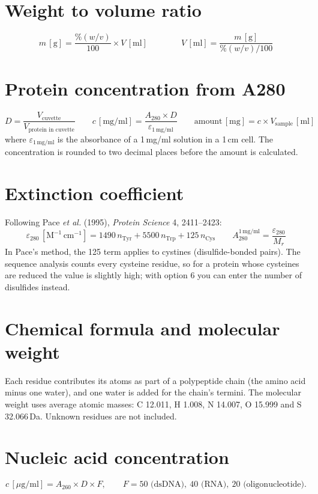 \documentclass[11pt,a4paper,oneside]{report}
\begin{document}
\section{Weight to volume ratio}
\[
  m\,[\text{g}] = \frac{\%(w/v)}{100}\times V\,[\text{ml}]
  \qquad\qquad
  V\,[\text{ml}] = \frac{m\,[\text{g}]}{\%(w/v)/100}
\]

\section{Protein concentration from A280}
\[
  D = \frac{V_\text{cuvette}}{V_\text{protein in cuvette}}
  \qquad
  c\,[\text{mg/ml}] = \frac{A_{280}\times D}{\varepsilon_{1\,\text{mg/ml}}}
  \qquad
  \text{amount}\,[\text{mg}] = c\times V_\text{sample}\,[\text{ml}]
\]
where $\varepsilon_{1\,\text{mg/ml}}$ is the absorbance of a 1\,mg/ml solution in a 1\,cm cell.
The concentration is rounded to two decimal places before the amount is calculated.

\section{Extinction coefficient}
Following Pace \emph{et al.} (1995), \emph{Protein Science} 4, 2411--2423:
\[
  \varepsilon_{280}\,[\text{M}^{-1}\,\text{cm}^{-1}] = 1490\,n_\text{Tyr} + 5500\,n_\text{Trp} + 125\,n_\text{Cys}
  \qquad
  A_{280}^{1\,\text{mg/ml}} = \frac{\varepsilon_{280}}{M_r}
\]
In Pace's method, the 125 term applies to cystines (disulfide-bonded pairs). The sequence analysis
counts every cysteine residue, so for a protein whose cysteines are reduced the value is slightly
high; with option 6 you can enter the number of disulfides instead.

\section{Chemical formula and molecular weight}
Each residue contributes its atoms as part of a polypeptide chain (the amino acid minus one water),
and one water is added for the chain's termini. The molecular weight uses average atomic masses:
C 12.011, H 1.008, N 14.007, O 15.999 and S 32.066\,Da. Unknown residues are not included.

\section{Nucleic acid concentration}
\[
  c\,[\mu\text{g/ml}] = A_{260}\times D\times F,\qquad
  F = 50 \text{ (dsDNA)},\ 40 \text{ (RNA)},\ 20 \text{ (oligonucleotide)}.
\]
\end{document}
